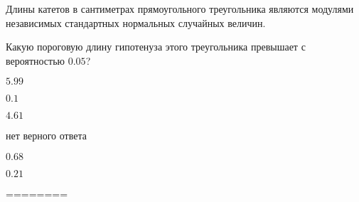 
\begin{question}
Длины катетов в сантиметрах прямоугольного треугольника являются
модулями независимых стандартных нормальных случайных величин.

Какую пороговую длину гипотенуза этого треугольника превышает с
вероятностью \(0.05\)?
\begin{answerlist}
  \item \(5.99\)
  \item \(0.1\)
  \item \(4.61\)
  \item нет верного ответа
  \item \(0.68\)
  \item \(0.21\)
\end{answerlist}
\end{question}

\begin{solution}
========
\end{solution}

